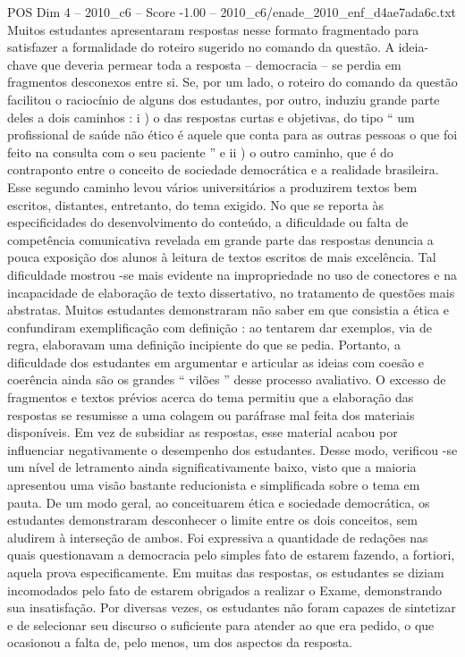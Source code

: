 \begin{textsample}{POS Dim 4 – 2010\_c6 – Score -1.00 – 2010\_c6/enade\_2010\_enf\_d4ae7ada6c.txt}
Muitos estudantes apresentaram respostas nesse formato fragmentado para satisfazer a formalidade do roteiro sugerido no comando da questão.
A ideia-chave que deveria permear toda a resposta – democracia – se perdia em fragmentos desconexos entre si.
Se, por um lado, o roteiro do comando da questão facilitou o raciocínio de alguns dos estudantes, por outro, induziu grande parte deles a dois caminhos : i ) o das respostas curtas e objetivas, do tipo “ um profissional de saúde não ético é aquele que conta para as outras pessoas o que foi feito na consulta com o seu paciente ” e ii ) o outro caminho, que é do contraponto entre o conceito de sociedade democrática e a realidade brasileira.
Esse segundo caminho levou vários universitários a produzirem textos bem escritos, distantes, entretanto, do tema exigido.
No que se reporta às especificidades do desenvolvimento do conteúdo, a dificuldade ou falta de competência comunicativa revelada em grande parte das respostas denuncia a pouca exposição dos alunos à leitura de textos escritos de mais excelência.
Tal dificuldade mostrou -se mais evidente na impropriedade no uso de conectores e na incapacidade de elaboração de texto dissertativo, no tratamento de questões mais abstratas.
Muitos estudantes demonstraram não saber em que consistia a ética e confundiram exemplificação com definição : ao tentarem dar exemplos, via de regra, elaboravam uma definição incipiente do que se pedia.
Portanto, a dificuldade dos estudantes em argumentar e articular as ideias com coesão e coerência ainda são os grandes “ vilões ” desse processo avaliativo.
O excesso de fragmentos e textos prévios acerca do tema permitiu que a elaboração das respostas se resumisse a uma colagem ou paráfrase mal feita dos materiais disponíveis.
Em vez de subsidiar as respostas, esse material acabou por influenciar negativamente o desempenho dos estudantes.
Desse modo, verificou -se um nível de letramento ainda significativamente baixo, visto que a maioria apresentou uma visão bastante reducionista e simplificada sobre o tema em pauta.
De um modo geral, ao conceituarem ética e sociedade democrática, os estudantes demonstraram desconhecer o limite entre os dois conceitos, sem aludirem à interseção de ambos.
Foi expressiva a quantidade de redações nas quais questionavam a democracia pelo simples fato de estarem fazendo, a fortiori, aquela prova especificamente.
Em muitas das respostas, os estudantes se diziam incomodados pelo fato de estarem obrigados a realizar o Exame, demonstrando sua insatisfação.
Por diversas vezes, os estudantes não foram capazes de sintetizar e de selecionar seu discurso o suficiente para atender ao que era pedido, o que ocasionou a falta de, pelo menos, um dos aspectos da resposta.

\end{textsample}
